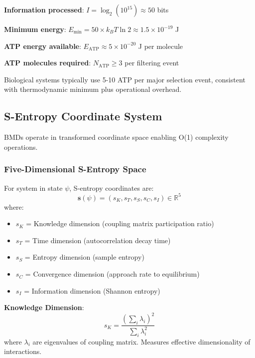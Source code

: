 \documentclass[11pt,onecolumn]{article}
\begin{document}
\textbf{Information processed}: $I = \log_2(10^{15}) \approx 50$ bits

\textbf{Minimum energy}: $E_{\text{min}} = 50 \times k_B T \ln 2 \approx 1.5 \times 10^{-19}$ J

\textbf{ATP energy available}: $E_{\text{ATP}} \approx 5 \times 10^{-20}$ J per molecule

\textbf{ATP molecules required}: $N_{\text{ATP}} \geq 3$ per filtering event

Biological systems typically use 5-10 ATP per major selection event, consistent with thermodynamic minimum plus operational overhead.

\subsection{S-Entropy Coordinate System}

BMDs operate in transformed coordinate space enabling O(1) complexity operations.

\subsubsection{Five-Dimensional S-Entropy Space}

\begin{definition}
For system in state $\psi$, S-entropy coordinates are:
\begin{equation}
\mathbf{s}(\psi) = (s_K, s_T, s_S, s_C, s_I) \in \mathbb{R}^5
\end{equation}
where:
\begin{itemize}
\item $s_K$ = Knowledge dimension (coupling matrix participation ratio)
\item $s_T$ = Time dimension (autocorrelation decay time)
\item $s_S$ = Entropy dimension (sample entropy)
\item $s_C$ = Convergence dimension (approach rate to equilibrium)
\item $s_I$ = Information dimension (Shannon entropy)
\end{itemize}
\end{definition}

\textbf{Knowledge Dimension}:
\begin{equation}
s_K = \frac{(\sum_i \lambda_i)^2}{\sum_i \lambda_i^2}
\end{equation}
where $\lambda_i$ are eigenvalues of coupling matrix. Measures effective dimensionality of interactions.
\end{document}
